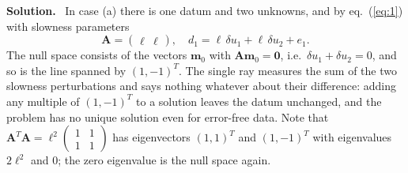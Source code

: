 \documentclass[a4paper,12pt]{paper}
\newenvironment{solution}{\par\noindent\textbf{Solution.}\ }{\par\medskip}
\begin{document}
\begin{solution}
In case (a) there is one datum and two unknowns, and by eq.~(\ref{eq:1}) with slowness parameters
\begin{equation}
    \mathbf{A} = \begin{pmatrix} \ell & \ell \end{pmatrix},\quad
    d_{1} = \ell\,\delta u_{1} + \ell\,\delta u_{2} + e_{1}.
    \label{eq:3}
\end{equation}
The null space consists of the vectors $\mathbf{m}_{0}$ with $\mathbf{A}\mathbf{m}_{0}=\mathbf{0}$, i.e.\
$\delta u_{1}+\delta u_{2}=0$, and so is the line spanned by $(1,-1)^{T}$. The single ray measures
the sum of the two slowness perturbations and says nothing whatever about their difference: adding
any multiple of $(1,-1)^{T}$ to a solution leaves the datum unchanged, and the problem has no unique
solution even for error-free data. Note that $\mathbf{A}^{T}\mathbf{A} = \ell^{2}\begin{pmatrix} 1 & 1
\\ 1 & 1\end{pmatrix}$ has eigenvectors $(1,1)^{T}$ and $(1,-1)^{T}$ with eigenvalues $2\ell^{2}$
and $0$; the zero eigenvalue is the null space again.


\end{solution}
\end{document}
